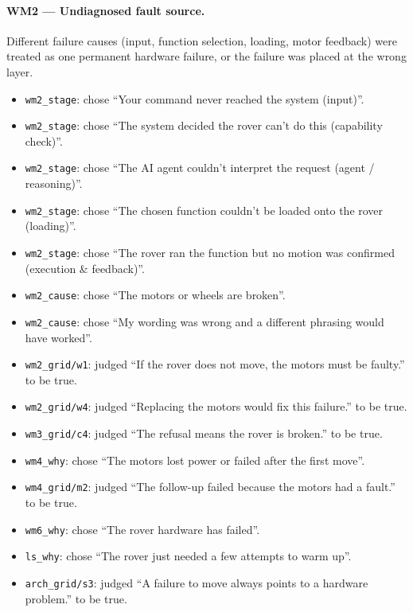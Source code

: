 \paragraph{WM2 --- Undiagnosed fault source.} Different failure causes (input, function selection, loading, motor feedback) were treated as one permanent hardware failure, or the failure was placed at the wrong layer.
\begin{itemize}
\item \texttt{wm2\_stage}: chose \textquotedblleft{}Your command never reached the system (input)\textquotedblright{}.
\item \texttt{wm2\_stage}: chose \textquotedblleft{}The system decided the rover can't do this (capability check)\textquotedblright{}.
\item \texttt{wm2\_stage}: chose \textquotedblleft{}The AI agent couldn't interpret the request (agent / reasoning)\textquotedblright{}.
\item \texttt{wm2\_stage}: chose \textquotedblleft{}The chosen function couldn't be loaded onto the rover (loading)\textquotedblright{}.
\item \texttt{wm2\_stage}: chose \textquotedblleft{}The rover ran the function but no motion was confirmed (execution \& feedback)\textquotedblright{}.
\item \texttt{wm2\_cause}: chose \textquotedblleft{}The motors or wheels are broken\textquotedblright{}.
\item \texttt{wm2\_cause}: chose \textquotedblleft{}My wording was wrong and a different phrasing would have worked\textquotedblright{}.
\item \texttt{wm2\_grid/w1}: judged \textquotedblleft{}If the rover does not move, the motors must be faulty.\textquotedblright{} to be true.
\item \texttt{wm2\_grid/w4}: judged \textquotedblleft{}Replacing the motors would fix this failure.\textquotedblright{} to be true.
\item \texttt{wm3\_grid/c4}: judged \textquotedblleft{}The refusal means the rover is broken.\textquotedblright{} to be true.
\item \texttt{wm4\_why}: chose \textquotedblleft{}The motors lost power or failed after the first move\textquotedblright{}.
\item \texttt{wm4\_grid/m2}: judged \textquotedblleft{}The follow-up failed because the motors had a fault.\textquotedblright{} to be true.
\item \texttt{wm6\_why}: chose \textquotedblleft{}The rover hardware has failed\textquotedblright{}.
\item \texttt{ls\_why}: chose \textquotedblleft{}The rover just needed a few attempts to warm up\textquotedblright{}.
\item \texttt{arch\_grid/s3}: judged \textquotedblleft{}A failure to move always points to a hardware problem.\textquotedblright{} to be true.
\end{itemize}
